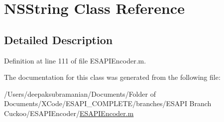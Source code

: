 \hypertarget{a00003}{
\section{NSString Class Reference}
\label{d1/d7c/a00003}
}


\subsection{Detailed Description}


Definition at line 111 of file ESAPIEncoder.m.



The documentation for this class was generated from the following file:\begin{DoxyCompactItemize}
\item 
/Users/deepaksubramanian/Documents/Folder of Documents/XCode/ESAPI\_\-COMPLETE/branches/ESAPI Branch Cuckoo/ESAPIEncoder/\hyperlink{a00018}{ESAPIEncoder.m}\end{DoxyCompactItemize}
